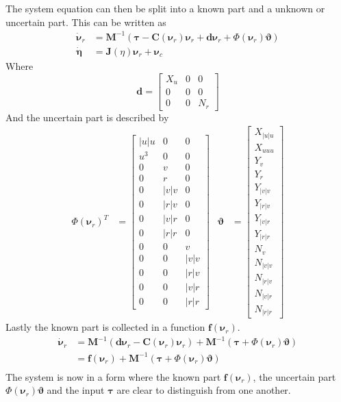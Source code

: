 \documentclass[12pt,a4]{article}
\begin{document}
The system equation can then be split into a known part and a unknown or uncertain part. This can be written as
\begin{align}
	\bm{\dot{\nu}}_r & = \bm{M}^{-1} (\bm{\tau} -\bm{C}(\bm{\nu}_r)\bm{\nu}_r + \bm{d} \bm{\nu}_r + \Phi(\bm{\nu}_r )\bm{\vartheta}) \\
	\bm{\dot{\eta}}  & = \bm{J}(\eta)\bm{\nu}_r + \bm{\nu}_c
\end{align}
Where
\begin{equation}
	\bm{d} = \begin{bmatrix}
		X_u & 0 & 0   \\
		0   & 0 & 0   \\
		0   & 0 & N_r
	\end{bmatrix}
\end{equation}
And the uncertain part is described by
\begin{align}
	\Phi(\bm{\nu}_r)^T & = \begin{bmatrix}
		|u|u & 0 & 0 \\ u^3 & 0 & 0 \\ 0& v &0 \\ 0& r &0 \\ 0&|v|v&0  \\ 0&|r|v&0  \\ 0&|v|r&0  \\ 0&|r|r&0  \\ 0&0& v \\ 0&0& |v|v \\ 0&0&|r|v \\ 0&0&|v|r \\ 0&0&|r|r
	\end{bmatrix}
	                   &
	\bm{\vartheta}     & = \begin{bmatrix}
		X_{|u|u} \\ X_{uuu} \\ Y_v \\ Y_r \\ Y_{|v|v} \\ Y_{|r|v} \\ Y_{|v|r} \\ Y_{|r|r} \\ N_v \\ N_{|v|v} \\ N_{|r|v} \\ N_{|v|r} \\ N_{|r|r}
	\end{bmatrix}
\end{align}
Lastly the known part is collected in a function $\bm{f}(\bm{\nu}_r)$.
\begin{align}
	\bm{\dot{\nu}}_r & = \bm{M}^{-1} (\bm{d} \bm{\nu}_r -\bm{C}(\bm{\nu}_r)\bm{\nu}_r ) + \bm{M}^{-1} (\bm{\tau} + \Phi(\bm{\nu}_r )\bm{\vartheta}) \\
	                 & =  \bm{f}(\bm{\nu}_r) + \bm{M}^{-1} (\bm{\tau} + \Phi(\bm{\nu}_r )\bm{\vartheta})                                            \\
\end{align}
The system is now in a form where the known part $\bm{f}(\bm{\nu}_r)$, the uncertain part $\Phi(\bm{\nu}_r )\bm{\vartheta}$ and the input $\bm{\tau}$
are clear to distinguish from one another.
\end{document}

